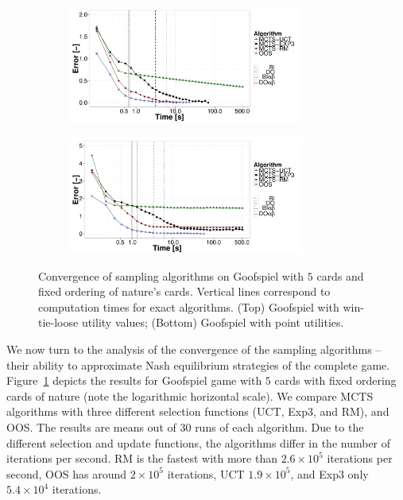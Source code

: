 \begin{figure}[t]
	\begin{subfigure}{1\textwidth}
		\centering
		\includegraphics[width=0.85\textwidth]{figures/convergence-gs-tf.pdf}%
	\end{subfigure}
	\begin{subfigure}{1\textwidth}
		\centering
		\includegraphics[width=0.85\textwidth]{figures/convergence-gs-ff.pdf}%
	\end{subfigure}
\caption{Convergence of sampling algorithms on Goofspiel with $5$ cards and fixed ordering of nature's cards.
Vertical lines correspond to computation times for exact algorithms.
(Top) Goofspiel with win-tie-loose utility values;
(Bottom) Goofspiel with point utilities.} \label{fig:off:conv:gs}
\end{figure}

We now turn to the analysis of the convergence of the sampling algorithms -- \ie their ability to approximate Nash equilibrium strategies of the complete game.
Figure~\ref{fig:off:conv:gs} depicts the results for Goofspiel game with $5$ cards with fixed ordering cards of nature (note the logarithmic horizontal scale).
We compare MCTS algorithms with three different selection functions (UCT, Exp3, and RM), and OOS.
The results are means out of $30$ runs of each algorithm.
Due to the different selection and update functions, the algorithms differ in the number of iterations per second.
RM is the fastest with more than $2.6\times 10^5$ iterations per second, OOS has around $2\times10^5$ iterations, UCT $1.9\times10^5$, and Exp3 only $5.4\times10^4$ iterations.

